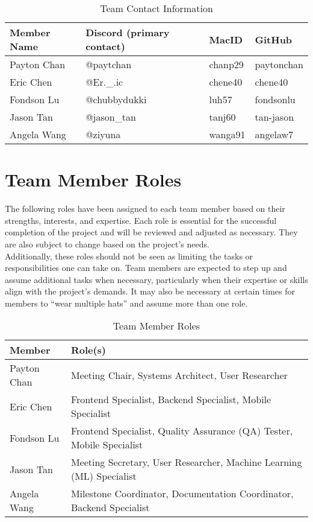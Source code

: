 \documentclass{article}
\begin{document}
\begin{table}[h!]
\centering
\caption{Team Contact Information}
\begin{tabular}{|l|l|l|l|}
\hline
\textbf{Member Name} & \textbf{Discord (primary contact)} & \textbf{MacID} &
\textbf{GitHub} \\ 
\hline
 Payton Chan   & @paytchan    & chanp29  & paytonchan \\ 
\hline
 Eric Chen     & @Er.\_.ic     & chene40  & chene40    \\ 
\hline 
Fondson Lu    & @chubbydukki & luh57    & fondsonlu  \\ 
\hline
Jason Tan     & @jason\_tan  & tanj60   & tan-jason  \\ 
\hline 
Angela Wang   & @ziyuna      & wanga91  & angelaw7   \\
\hline
\end{tabular}
\end{table}

\newpage

\section{Team Member Roles}

The following roles have been assigned to each team member based on their
strengths, interests, and expertise. Each role is essential for the successful
completion of the project and will be reviewed and adjusted as necessary. They 
are also subject to change based on the project's needs. \\

Additionally, these roles should not be seen as limiting the tasks or
responsibilities one can take on. Team members are expected to step up and
assume additional tasks when necessary, particularly when their expertise or
skills align with the project's demands. It may also be necessary at certain
times for members to “wear multiple hats” and assume more than one role.

\begin{table}[h!]
\centering
\caption{Team Member Roles}
\begin{tabular}{|l|l|}
\hline
\textbf{Member} & \textbf{Role(s)} \\ 
\hline
Payton Chan & Meeting Chair, Systems Architect, User Researcher \\ 
\hline
Eric Chen & Frontend Specialist, Backend Specialist, Mobile Specialist \\ 
\hline 
Fondson Lu & Frontend Specialist, Quality Assurance (QA) Tester, Mobile
Specialist \\ 
\hline
Jason Tan & Meeting Secretary, User Researcher, Machine Learning (ML) Specialist
\\ 
\hline 
Angela Wang & Milestone Coordinator, Documentation Coordinator, Backend
Specialist \\ 
\hline
\end{tabular}
\end{table}
\end{document}

